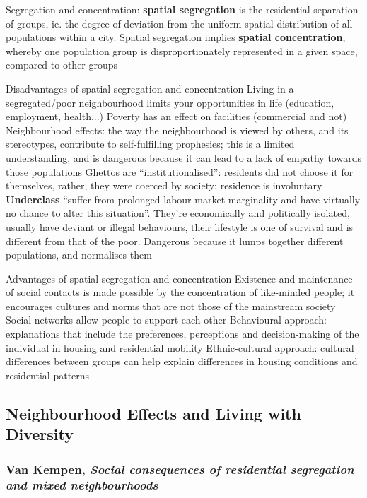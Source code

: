 \documentclass{article}
\begin{document}
\begin{outline}
	\1 Segregation and concentration: \textbf{spatial segregation} is the residential separation of groups, ie. the degree of deviation from the uniform spatial distribution of all populations within a city. Spatial segregation implies \textbf{spatial concentration}, whereby one population group is disproportionately represented in a given space, compared to other groups
		
	\1 Disadvantages of spatial segregation and concentration
		\2 Living in a segregated/poor neighbourhood limits your opportunities in life (education, employment, health...)
		\2 Poverty has an effect on facilities (commercial and not)
		\2 Neighbourhood effects: the way the neighbourhood is viewed by others, and its stereotypes, contribute to self-fulfilling prophesies; this is a limited understanding, and is dangerous because it can lead to a lack of empathy towards those populations
		\2 Ghettos are ``institutionalised'': residents did not choose it for themselves, rather, they were coerced by society; residence is involuntary
		\2 \textbf{Underclass} ``suffer from prolonged labour-market marginality and have virtually no chance to alter this situation''. They're economically and politically isolated, usually have deviant or illegal behaviours, their lifestyle is one of survival and is different from that of the poor. Dangerous because it lumps together different populations, and normalises them
		
	\1 Advantages of spatial segregation and concentration
		\2 Existence and maintenance of social contacts is made possible by the concentration of like-minded people; it encourages cultures and norms that are not those of the mainstream society
		\2 Social networks allow people to support each other
	\1 Behavioural approach: explanations that include the preferences, perceptions and decision-making of the individual in housing and residential mobility
	\1 Ethnic-cultural approach: cultural differences between groups can help explain differences in housing conditions and residential patterns

\end{outline}

\subsection{Neighbourhood Effects and Living with Diversity}

\subsubsection{Van Kempen, \textit{Social consequences of residential segregation and mixed neighbourhoods}}
\end{document}
